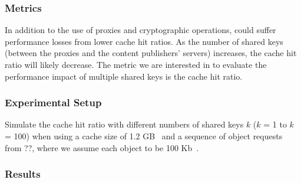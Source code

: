 \subsubsection{Metrics}
In addition to the use of proxies and cryptographic operations, \system{} could suffer performance losses from lower cache hit ratios.  As the number 
of shared keys (between the proxies and the content publishers' servers) increases, the cache hit ratio will likely decrease.  The metric we are interested 
in to evaluate the performance impact of multiple shared keys is the cache hit ratio.

\subsubsection{Experimental Setup}
Simulate the cache hit ratio with different numbers of shared keys $k$ ($k$ = 1 to $k$ = 100) when using a cache size of 1.2 GB~\cite{berger2017adaptsize} and a sequence of object requests from ??, where we assume each object to be 100 Kb~\cite{berger2016achieving}.

\subsubsection{Results}
